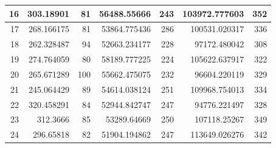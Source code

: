 \begin{table}
\begin{adjustwidth}{}{}
{{\begin{tabular}{|r|r|r|r|r|r|r|}
\hline
16                                         & 303.18901                    & 81                                    & 56488.55666                    & 243                                   & 103972.777603                & 352                                    \\ 
\hline
17                                         & 268.166175                   & 81                                    & 53864.775436                   & 286                                   & 100531.020317                & 336                                    \\ 
\hline
18                                         & 262.328487                   & 94                                    & 52663.234177                   & 228                                   & 97172.480042                 & 308                                    \\ 
\hline
19                                         & 274.764059                   & 80                                    & 58189.777225                   & 224                                   & 105622.637917                & 322                                    \\ 
\hline
20                                         & 265.671289                   & 100                                   & 55662.475075                   & 232                                   & 96604.220119                 & 329                                    \\ 
\hline
21                                         & 245.064429                   & 89                                    & 54614.038124                   & 251                                   & 109968.754013                & 334                                    \\ 
\hline
22                                         & 320.458291                   & 84                                    & 52944.842747                   & 247                                   & 94776.221497                 & 328                                    \\ 
\hline
23                                         & 312.3666                     & 85                                    & 53289.64669                    & 250                                   & 107118.25267                 & 349                                    \\ 
\hline
24                                         & 296.65818                    & 82                                    & 51904.194862                   & 247                                   & 113649.026276                & 342                                    \\ 

\end{tabular}}}
\end{adjustwidth}
\end{table}
